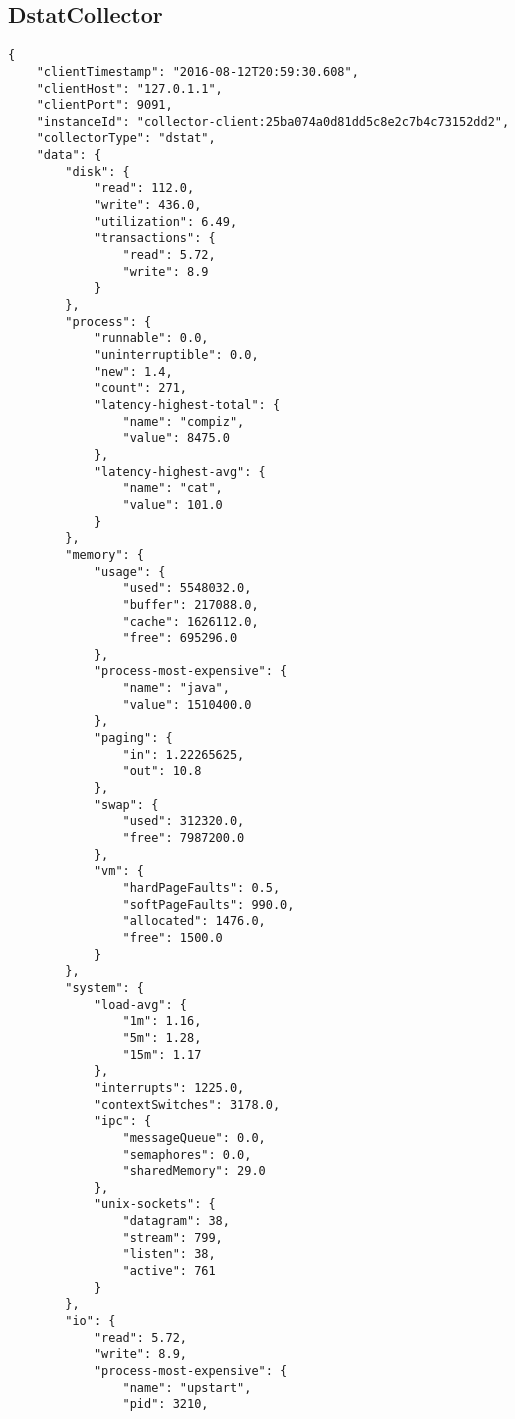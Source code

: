 \subsection{DstatCollector}
\label{app:dstat-result}
\begin{lstlisting}[caption={"DstatCollector" JSON result}, captionpos=b, label={lst:json-dstat}]
{
    "clientTimestamp": "2016-08-12T20:59:30.608",
    "clientHost": "127.0.1.1",
    "clientPort": 9091,
    "instanceId": "collector-client:25ba074a0d81dd5c8e2c7b4c73152dd2",
    "collectorType": "dstat",
    "data": {
        "disk": {
            "read": 112.0,
            "write": 436.0,
            "utilization": 6.49,
            "transactions": {
                "read": 5.72,
                "write": 8.9
            }
        },
        "process": {
            "runnable": 0.0,
            "uninterruptible": 0.0,
            "new": 1.4,
            "count": 271,
            "latency-highest-total": {
                "name": "compiz",
                "value": 8475.0
            },
            "latency-highest-avg": {
                "name": "cat",
                "value": 101.0
            }
        },
        "memory": {
            "usage": {
                "used": 5548032.0,
                "buffer": 217088.0,
                "cache": 1626112.0,
                "free": 695296.0
            },
            "process-most-expensive": {
                "name": "java",
                "value": 1510400.0
            },
            "paging": {
                "in": 1.22265625,
                "out": 10.8
            },
            "swap": {
                "used": 312320.0,
                "free": 7987200.0
            },
            "vm": {
                "hardPageFaults": 0.5,
                "softPageFaults": 990.0,
                "allocated": 1476.0,
                "free": 1500.0
            }
        },
        "system": {
            "load-avg": {
                "1m": 1.16,
                "5m": 1.28,
                "15m": 1.17
            },
            "interrupts": 1225.0,
            "contextSwitches": 3178.0,
            "ipc": {
                "messageQueue": 0.0,
                "semaphores": 0.0,
                "sharedMemory": 29.0
            },
            "unix-sockets": {
                "datagram": 38,
                "stream": 799,
                "listen": 38,
                "active": 761
            }
        },
        "io": {
            "read": 5.72,
            "write": 8.9,
            "process-most-expensive": {
                "name": "upstart",
                "pid": 3210,

\end{lstlisting}
